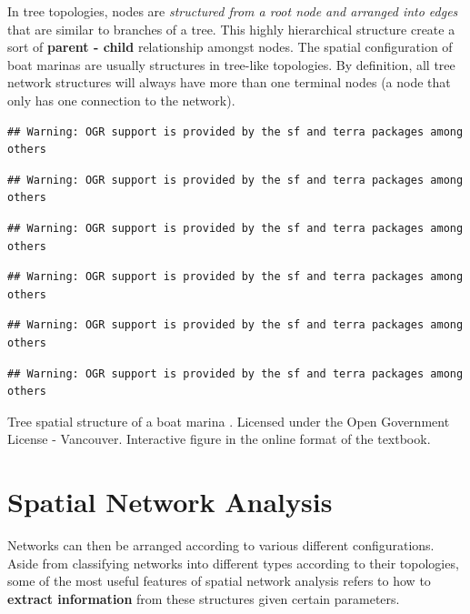\documentclass[
]{book}
\begin{document}
In tree topologies, nodes are \emph{structured from a root node and arranged into edges} that are similar to branches of a tree. This highly hierarchical structure create a sort of \textbf{parent - child} relationship amongst nodes. The spatial configuration of boat marinas are usually structures in tree-like topologies. By definition, all tree network structures will always have more than one terminal nodes (a node that only has one connection to the network).

\begin{verbatim}
## Warning: OGR support is provided by the sf and terra packages among others
\end{verbatim}

\begin{verbatim}
## Warning: OGR support is provided by the sf and terra packages among others
\end{verbatim}

\begin{verbatim}
## Warning: OGR support is provided by the sf and terra packages among others
\end{verbatim}

\begin{verbatim}
## Warning: OGR support is provided by the sf and terra packages among others
\end{verbatim}

\begin{verbatim}
## Warning: OGR support is provided by the sf and terra packages among others
\end{verbatim}

\begin{verbatim}
## Warning: OGR support is provided by the sf and terra packages among others
\end{verbatim}

\label{fig:8-boat-marina}Tree spatial structure of a boat marina \citep{city_of_vancouver_open_nodate}. Licensed under the Open Government License - Vancouver. Interactive figure in the online format of the textbook.

\hypertarget{spatial-network-analysis}{%
\section{Spatial Network Analysis}\label{spatial-network-analysis}}

Networks can then be arranged according to various different configurations. Aside from classifying networks into different types according to their topologies, some of the most useful features of spatial network analysis refers to how to \textbf{extract information} from these structures given certain parameters.
\end{document}
